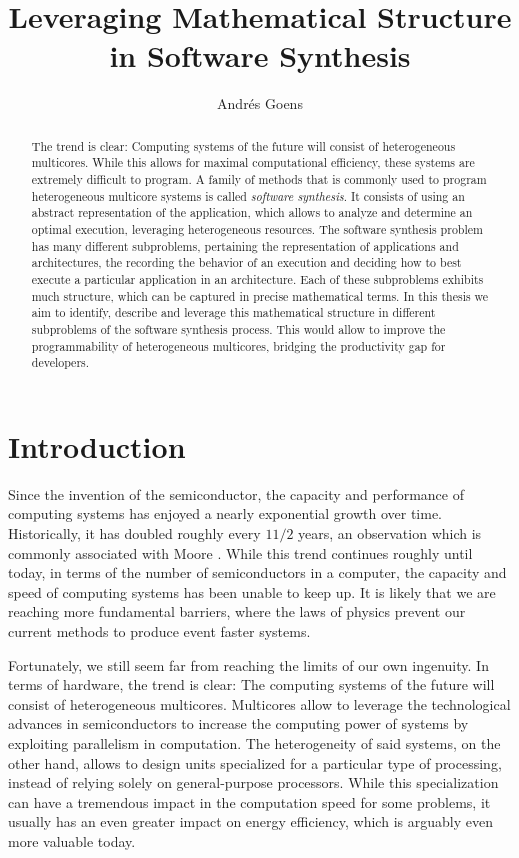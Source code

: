 \documentclass{article}
\title{Leveraging Mathematical Structure in Software Synthesis}
\author{Andr\'{e}s Goens}
\begin{document}
\date{}
\maketitle
\begin{abstract}
The trend is clear: Computing systems of the future will consist of heterogeneous multicores. While this allows for maximal computational efficiency, these systems are extremely difficult to program.
A family of methods that is commonly used to program heterogeneous multicore systems is called \emph{software synthesis}.
It consists of using an abstract representation of the application, which allows to analyze and determine an optimal execution, leveraging heterogeneous resources.
The software synthesis problem has many different subproblems, pertaining the representation of applications and architectures, the recording the behavior of an execution and deciding how to best execute a particular application in an architecture.
Each of these subproblems exhibits much structure, which can be captured in precise mathematical terms. In this thesis we aim to identify, describe and leverage this mathematical structure in different subproblems of the software synthesis process.
This would allow to improve the programmability of heterogeneous multicores, bridging the productivity gap for developers.

\end{abstract}


\section*{Introduction}
Since the invention of the semiconductor, the capacity and performance of computing systems has enjoyed a nearly exponential growth over time. Historically, it has doubled roughly every $1 1/2$ years, an observation which is commonly associated with Moore \cite{schaller1997moore}.
While this trend continues roughly until today, in terms of the number of semiconductors in a computer, the capacity and speed of computing systems has been unable to keep up. It is likely that we are reaching more fundamental barriers, where the laws of physics prevent our
current methods to produce event faster systems. 

Fortunately, we still seem far from reaching the limits of our own ingenuity. In terms of hardware, the trend is clear: The computing systems of the future will consist of heterogeneous multicores. Multicores allow to leverage the technological advances in semiconductors to 
increase the computing power of systems by exploiting parallelism in computation. The heterogeneity of said systems, on the other hand, allows to design units specialized for a particular type of processing, instead of relying solely on general-purpose processors.
While this specialization can have a tremendous impact in the computation speed for some problems, it usually has an even greater impact on energy efficiency, which is arguably even more valuable today.
\end{document}
